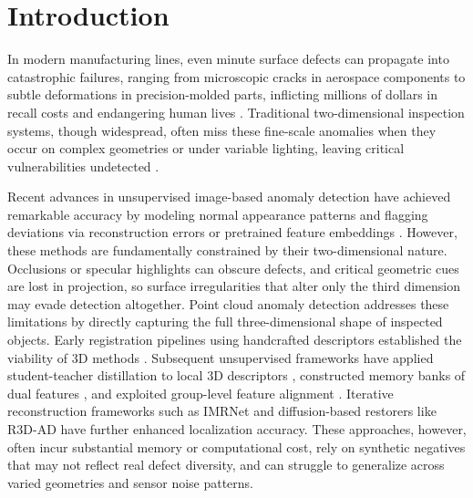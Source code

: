 \section{Introduction}
\label{sec:introduction}

In modern manufacturing lines, even minute surface defects can propagate into catastrophic failures, ranging from microscopic cracks in aerospace components to subtle deformations in precision-molded parts, inflicting millions of dollars in recall costs and endangering human lives \cite{hoang2025unsupervised, feng2025hyperbolic, egodawela2025metal, hoang2025vistogeo}. Traditional two-dimensional inspection systems, though widespread, often miss these fine-scale anomalies when they occur on complex geometries or under variable lighting, leaving critical vulnerabilities undetected \cite{tong2025dam, hoang2025image, zhang2025unsupervised, song2025rstd}.

Recent advances in unsupervised image-based anomaly detection have achieved remarkable accuracy by modeling normal appearance patterns and flagging deviations via reconstruction errors or pretrained feature embeddings \cite{bergmann2020uninformed, shi2021dfr, roth2022towards}. However, these methods are fundamentally constrained by their two-dimensional nature. Occlusions or specular highlights can obscure defects, and critical geometric cues are lost in projection, so surface irregularities that alter only the third dimension may evade detection altogether. Point cloud anomaly detection addresses these limitations by directly capturing the full three-dimensional shape of inspected objects. Early registration pipelines using handcrafted descriptors established the viability of 3D methods \cite{horwitz2023back}. Subsequent unsupervised frameworks have applied student-teacher distillation to local 3D descriptors \cite{bergmann2023anomaly}, constructed memory banks of dual features \cite{liu2023real3d}, and exploited group-level feature alignment \cite{zhu2024towards}. Iterative reconstruction frameworks such as IMRNet \cite{li2024towards} and diffusion-based restorers like R3D-AD \cite{zhou2024r3d} have further enhanced localization accuracy. These approaches, however, often incur substantial memory or computational cost, rely on synthetic negatives that may not reflect real defect diversity, and can struggle to generalize across varied geometries and sensor noise patterns.

